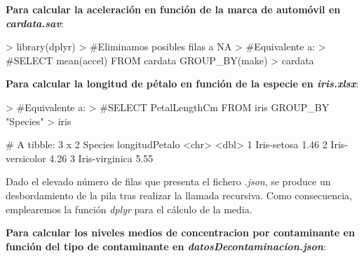 \documentclass [a4paper] {article}
\begin{document}
\hfil \textbf{Para calcular la aceleración en función de la marca de automóvil en \textit{cardata.sav}}: \par
\begin{Schunk}
\begin{Sinput}
> library(dplyr)
> #Eliminamos posibles filas a NA
> #Equivalente a:
> #SELECT mean(accel) FROM cardata GROUP_BY(make)
> cardata %>% group_by(cardata$make) %>% summarise(aceleracion = mean(na.omit(cardata$accel)))
\end{Sinput}
\end{Schunk}
\newpage
\hfil \textbf{Para calcular la longitud de pétalo en función de la especie en \textit{iris.xlsx}}: \par
\begin{Schunk}
\begin{Sinput}
> #Equivalente a:
> #SELECT PetalLengthCm FROM iris GROUP_BY "Species"
> iris %>% group_by(Species) %>% summarise(longitudPetalo = mean(PetalLengthCm))
\end{Sinput}
\begin{Soutput}
# A tibble: 3 x 2
  Species         longitudPetalo
  <chr>                    <dbl>
1 Iris-setosa               1.46
2 Iris-versicolor           4.26
3 Iris-virginica            5.55
\end{Soutput}
\end{Schunk}

Dado el elevado número de filas que presenta el fichero \textit{.json}, se produce un desbordamiento de la pila tras realizar la llamada recursiva.
Como consecuencia, emplearemos la función \textit{dplyr} para el cálculo de la media.

\textbf{Para calcular los niveles medios de concentracion por contaminante en función del tipo de contaminante en \textit{datosDecontaminacion.json}}:
\end{document}
